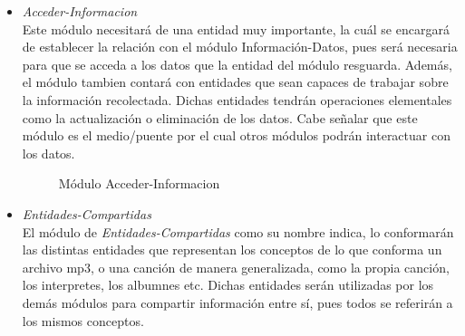 \documentclass[10pt,letterpaper]{report}
\begin{document}
\begin{itemize}
\begin{figure}[H]
\caption{Obtener-Informacion-Datos}
\label{fig:informacion-datos}
\end{figure}

\item  \textit{Acceder-Informacion} \\
    \noindent Este módulo necesitará de una entidad muy importante, la cuál se encargará de establecer la relación con el módulo Información-Datos, pues será necesaria para que se acceda a los datos que la entidad del módulo resguarda. Además, el módulo tambien contará con entidades que sean capaces de trabajar sobre la información recolectada. Dichas entidades tendrán operaciones elementales como la actualización o eliminación de los datos. Cabe señalar que este módulo es el medio/puente por el cual otros módulos podrán interactuar con los datos.

    \begin{figure}[H]
\centering


\caption{Módulo Acceder-Informacion}
\label{fig:obtener-informacion-datos}
\end{figure}

\item  \textit{Entidades-Compartidas} \\
\noindent El módulo de \textit{Entidades-Compartidas} como su nombre indica, lo conformarán las distintas entidades que representan los conceptos de lo que conforma un archivo mp3, o una canción de manera generalizada, como la propia canción, los interpretes, los albumnes etc. Dichas entidades serán utilizadas por los demás módulos para compartir información entre sí, pues todos se referirán a los mismos conceptos.

        \begin{figure}[H]
\centering


\end{figure}
\end{itemize}
\end{document}
